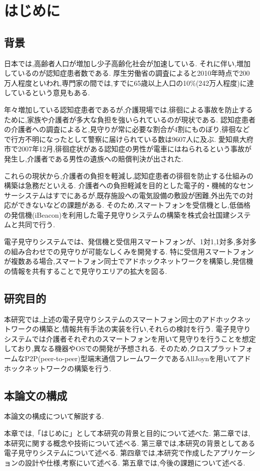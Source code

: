 \chapter{はじめに}
\label{chap:introduction}

\section{背景}
日本では,高齢者人口が増加し少子高齢化社会が加速している.
それに伴い,増加しているのが認知症患者数である.
厚生労働省の調査\cite{厚生労働省}によると2010年時点で200万人程度といわれ,専門家の間では,すでに65歳以上人口の10\%(242万人程度)に達しているという意見もある.

年々増加している認知症患者であるが,介護現場では,徘徊による事故を防止するために,家族や介護者が多大な負担を強いられているのが現状である.
認知症患者の介護者への調査\cite{山梨県}によると,見守りが常に必要な割合が4割にものぼり,徘徊などで行方不明になったとして警察に届けられている数は9607人に及ぶ.
愛知県大府市で2007年12月,徘徊症状がある認知症の男性が電車にはねられるという事故が発生し,介護者である男性の遺族への賠償判決が出された.

これらの現状から,介護者の負担を軽減し,認知症患者の徘徊を防止する仕組みの構築は急務だといえる.
介護者への負担軽減を目的とした電子的・機械的なセンサーシステムはすでにあるが,既存施設への電気設備の敷設が困難,外出先での対応ができないなどの課題がある.
そのため,スマートフォンを受信機とし,低価格の発信機(iBeacon)を利用した電子見守りシステムの構築を株式会社国建システムと共同で行う.

電子見守りシステムでは、発信機と受信用スマートフォンが、1対1,1対多,多対多の組み合わせでの見守りが可能なしくみを開発する.
特に受信用スマートフォンが複数ある場合,スマートフォン同士でアドホックネットワークを構築し,発信機の情報を共有することで見守りエリアの拡大を図る.

\section{研究目的}
本研究では,上述の電子見守りシステムのスマートフォン同士のアドホックネットワークの構築と,情報共有手法の実装を行い,それらの検討を行う.
電子見守りシステムでは介護者それぞれのスマートフォンを用いて見守りを行うことを想定しており,異なる機器やOSでの開発が予想される.
そのため,クロスプラットフォームなP2P(peer-to-peer)型端末通信フレームワークであるAllJoynを用いてアドホックネットワークの構築を行う.

\section{本論文の構成}
本論文の構成について解説する.

本章では,「はじめに」として本研究の背景と目的について述べた.
第二章では,本研究に関する概念や技術について述べる.
第三章では,本研究の背景としてある電子見守りシステムについて述べる.
第四章では,本研究で作成したアプリケーションの設計や仕様,考察にいて述べる.
第五章では,今後の課題について述べる.
